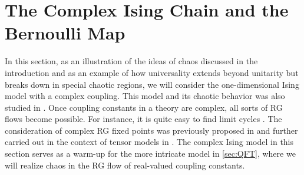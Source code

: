 \section{The Complex Ising Chain and the Bernoulli Map}
\label{sec:Ising}
In this section, as an illustration of the ideas of chaos discussed in the introduction and as an example of how universality extends beyond unitarity but breaks down in special chaotic regions, we will consider the one-dimensional Ising model with a complex coupling. This model and its chaotic behavior was also studied in \cite{Dolan:1994wt}. Once coupling constants in a theory are complex, all sorts of RG flows become possible. For instance, it is quite easy to find limit cycles \cite{faedo2021multiple}. The consideration of complex RG fixed points was previously proposed in \cite{Gorbenko:2018dtm,Gorbenko:2018ncu} and further carried out in the context of tensor models in \cite{Giombi:2017dtl}.  The complex Ising model in this section serves as a warm-up for the more intricate model in \cref{sec:QFT}, where we will realize chaos in the RG flow of real-valued coupling constants.



